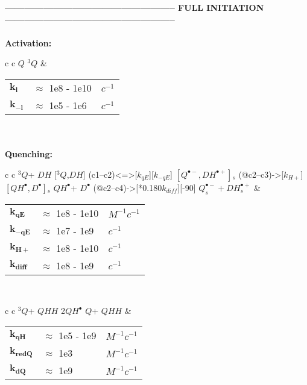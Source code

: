 \documentclass{article}
\def\IRP{$\left[Q^{\bullet -},DH^{\bullet +}\right]{}_s$}
\def\QH{$QH^{\bullet }$}
\def\D{$D^{\bullet }$}
\def\Q{$Q$}
\def\Qt{$^{3}Q$}
\def\DH{$DH$}
\def\QHH{$QHH$}
\begin{document}
\newpage
\textbf{----------------------------------------------------- FULL INITIATION -----------------------------------------------------}
\\
\\
\textbf{Activation:}
\begin{tabular}{ c c }
    \schemestart
    \Q
    \arrow{<=>[$h\nu$, $k_l$][$k_{-l}$]}
    \Qt
    \schemestop
     & \begin{tabular}{ l l l }
           $\mathbf{k_l}$    & $\approx$ 1e8 - 1e10 & $c^{-1}$ \\
           $\mathbf{k_{-l}}$ & $\approx$ 1e5  - 1e6 & $c^{-1}$ \\\hline
       \end{tabular}
    \vspace{1.5mm}
\end{tabular}
\vspace{1.5mm}
\\
\\
\textbf{Quenching:}

\begin{tabular}{ c c }
    \schemestart
    \Qt + \DH
    \arrow{<=>[$k_{diff}$][$k_{dis}$]}
    $[$\Qt,\DH$]$
    \arrow(c1--c2){<=>[$k_{qE}$][$k_{-qE}$]}
    \IRP
    \arrow(@c2--c3){->[$k_{H+}$]}
    $\left[QH^{\bullet},D^{\bullet}\right]{}_s$
    \arrow{->[$k_{diff}$]}
    \QH + \D
    \arrow(@c2--c4){->[*{0.180}$k_{diff}$]}[-90]
    $Q_s^{\bullet -} + DH_s^{\bullet +}$
    \schemestop
     & \begin{tabular}{ l l l }
           $\mathbf{k_{qE}}$   & $\approx$ 1e8 - 1e10 & $M^{-1}c^{-1}$ \\
           $\mathbf{k_{-qE}}$  & $\approx$ 1e7 - 1e9  & $c^{-1}$       \\
           $\mathbf{k_{H+}}$   & $\approx$ 1e8 - 1e10 & $c^{-1}$       \\
           $\mathbf{k_{diff}}$ & $\approx$ 1e8 - 1e9  & $c^{-1}$       \\\hline
       \end{tabular}
    \vspace{1.5mm}
    \\
\end{tabular}
\vspace{1.5mm}

\begin{tabular}{ c c }
    \schemestart
    \Qt + \QHH
    \arrow{->[$k_{qH}$]}
    2\QH
    \arrow{<=>[$k_{dQ}$][$k_{redQ}$]}
    \Q + \QHH
    \schemestop
     & \begin{tabular}{ l l l }
           $\mathbf{k_{qH}}$   & $\approx$ 1e5 - 1e9 & $M^{-1}c^{-1}$ \\
           $\mathbf{k_{redQ}}$ & $\approx$ 1e3       & $M^{-1}c^{-1}$ \\
           $\mathbf{k_{dQ}}$   & $\approx$ 1e9       & $M^{-1}c^{-1}$ \\\hline
       \end{tabular}
    \vspace{1.5mm}
\end{tabular}
\vspace{1.5mm}
\end{document}
